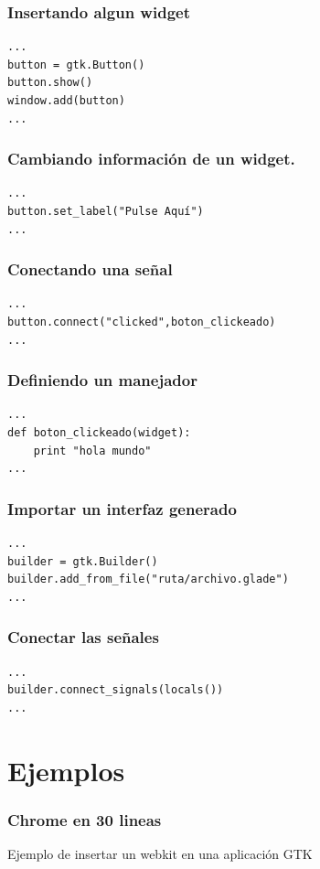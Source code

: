 \documentclass[10pt]{beamer}
\begin{document}
  \begin{frame}[containsverbatim]
    \frametitle{Insertando algun widget}
    \begin{verbatim}
...
button = gtk.Button()
button.show()
window.add(button)
...
    \end{verbatim}
  
  \end{frame}
  
  \begin{frame}[containsverbatim]
    \frametitle{Cambiando información de un widget.}
    \begin{verbatim}
...
button.set_label("Pulse Aquí")
...
    \end{verbatim}
  \end{frame}
  
  \begin{frame}[containsverbatim]
    \frametitle{Conectando una señal}
    \begin{verbatim}
...
button.connect("clicked",boton_clickeado)
...
    \end{verbatim}
  \end{frame}

  \begin{frame}[containsverbatim]
    \frametitle{Definiendo un manejador}
    \begin{verbatim}
...
def boton_clickeado(widget):
	print "hola mundo"
...
    \end{verbatim}
  \end{frame}

  \begin{frame}[containsverbatim]
    \frametitle{Importar un interfaz generado}
    \begin{verbatim}
...
builder = gtk.Builder()
builder.add_from_file("ruta/archivo.glade")
...
    \end{verbatim}
  \end{frame}

  \begin{frame}[containsverbatim]
    \frametitle{Conectar las señales}
    \begin{verbatim}
...
builder.connect_signals(locals())
...
    \end{verbatim}
  \end{frame}

  \section{Ejemplos}

  \begin{frame}[containsverbatim]
    \frametitle{Chrome en 30 lineas}
    Ejemplo de insertar un webkit en una aplicación GTK
  \end{frame}
\end{document}
